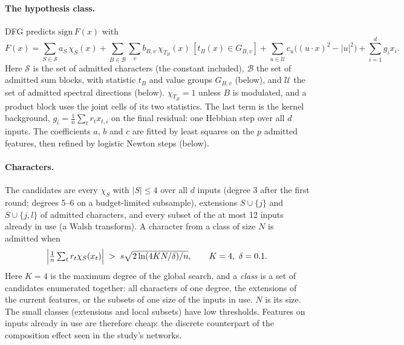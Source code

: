 \paragraph{The hypothesis class.} DFG predicts $\mathrm{sign}\,F(x)$ with
\begin{equation}\label{eq:dfgclass}
F(x)=\sum_{S\in\mathcal S}a_S\,\chi_S(x)+\sum_{B\in\mathcal B}\sum_{v}b_{B,v}\,\chi_{T_B}(x)\,[t_B(x)\in G_{B,v}]+\sum_{u\in\mathcal U}c_u\bigl((u\cdot x)^2-|u|^2\bigr)+\sum_{i=1}^d g_ix_i .
\end{equation}
Here $\mathcal S$ is the set of admitted characters (the constant included), $\mathcal B$ the set of admitted sum blocks, with statistic $t_B$ and value groups $G_{B,v}$ (below), and $\mathcal U$ the set of admitted spectral directions (below). $\chi_{T_B}=1$ unless $B$ is modulated, and a product block uses the joint cells of its two statistics. The last term is the kernel background, $g_i=\frac1n\sum_tr_tx_{t,i}$ on the final residual: one Hebbian step over all $d$ inputs. The coefficients $a$, $b$ and $c$ are fitted by least squares on the $p$ admitted features, then refined by logistic Newton steps (below).

\paragraph{Characters.} The candidates are every $\chi_S$ with $|S|\le4$ over all $d$ inputs (degree 3 after the first round; degrees 5--6 on a budget-limited subsample), extensions $S\cup\{j\}$ and $S\cup\{j,l\}$ of admitted characters, and every subset of the at most 12 inputs already in use (a Walsh transform). A character from a class of size $N$ is admitted when
\begin{equation}\label{eq:chartest}
\Bigl|\tfrac1n\textstyle\sum_t r_t\chi_S(x_t)\Bigr|\;>\;s\sqrt{2\ln(4KN/\delta)/n},\qquad K=4,\ \delta=0.1 .
\end{equation}
Here $K=4$ is the maximum degree of the global search, and a \emph{class} is a set of candidates enumerated together: all characters of one degree, the extensions of the current features, or the subsets of one size of the inputs in use. $N$ is its size. The small classes (extensions and local subsets) have low thresholds. Features on inputs already in use are therefore cheap: the discrete counterpart of the composition effect seen in the study's networks.

